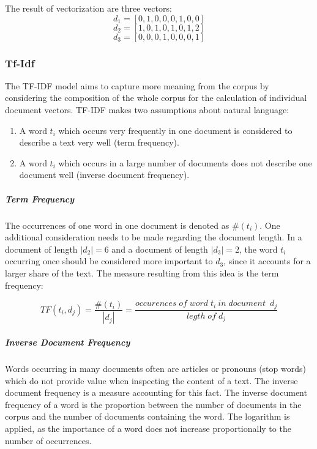             The result of vectorization are three vectors:
            \[ d_{1} = [0,1,0,0,0,1,0,0] \]
            \[ d_{2} = [1,0,1,0,1,0,1,2] \]	
            \[ d_{3} = [0,0,0,1,0,0,0,1]\]
            
            \subsubsection{Tf-Idf}
            \label{section:tfidf}
            The \ac{TF-IDF} model aims to capture more meaning from the corpus by considering the composition of the whole corpus for the calculation of individual document vectors. \ac{TF-IDF} makes two assumptions about natural language:
            \begin{enumerate}
            	\item A word $t_{i} $ which occurs very frequently in one document is considered to describe a text very well (term frequency).
            	\item A word $t_{i} $ which occurs in a large number of documents does not describe one document well (inverse document frequency).
            \end{enumerate}
            
            \subparagraph{Term Frequency}
            The occurrences of one word in one document is denoted as $ \#( t_{i}) $.
            One additional consideration needs to be made regarding the document length. In a document of length $ |d_{2}| = 6 $ and a document of length  $ |d_{3}| = 2 $, the word $ t_{i} $occurring once should be considered more important to $ d_{3} $, since it accounts for a larger share of the text. The measure resulting from this idea is the term frequency:
            
            \[ TF(t_{i}, d_{j}) =   \dfrac{\#( t_{i})}{|d_{j}|} = \dfrac{occurences \; of \; word \; t_{i} \: in \; document \;\:   d_{j}}{legth \; of \; d_{j}} \]
            
            \subparagraph{Inverse Document Frequency}
            Words occurring in many documents often are articles or pronouns (stop words) which do not provide value when inspecting the content of a text. The inverse document frequency is a measure accounting for this fact. The inverse document frequency of a word is the proportion between the number of documents in the corpus and the number of documents containing the word. The logarithm is applied, as the importance of a word does not increase proportionally to the number of occurrences.
        
